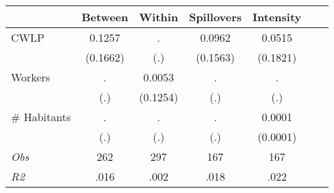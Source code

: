 \begin{tabular}{l*{6}{c}}\hline&\multicolumn{1}{c}{Between}&\multicolumn{1}{c}{Within}&\multicolumn{1}{c}{Spillovers}&\multicolumn{1}{c}{Intensity}\\ \hline 
CWLP & 0.1257 & . & 0.0962 & 0.0515 \\
 & (0.1662) & (.) & (0.1563) & (0.1821) \\
Workers & . & 0.0053 & . & . \\
 & (.) & (0.1254) & (.) & (.) \\
\# Habitants & . & . & . & 0.0001 \\
  & (.) & (.) & (.) & (0.0001) \\
\hline \textit{Obs} & 262 & 297 & 167 & 167  \\ \textit{R2} & .016 & .002 & .018 & .022 \\ \hline \end{tabular}
